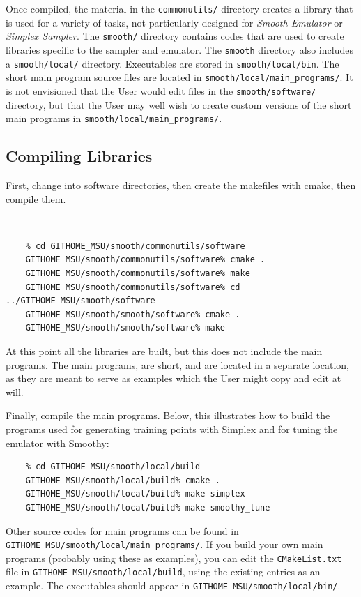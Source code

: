 \documentclass[main.tex]{subfiles}
\begin{document}
Once compiled, the material in the {\tt commonutils/} directory creates a library that is used for a variety of tasks, not particularly designed for {\it Smooth Emulator} or {\it Simplex Sampler}. The {\tt smooth/} directory contains codes that are used to create libraries specific to the sampler and emulator. The {\tt smooth} directory also includes a {\tt smooth/local/} directory. Executables are stored in {\tt smooth/local/bin}. The short main program source files are located in {\tt smooth/local/main\_programs/}. It is not envisioned that the User would edit files in the {\tt smooth/software/} directory, but that the User may well wish to create custom versions of the short main programs in {\tt smooth/local/main\_programs/}.

\subsection{Compiling Libraries }

First, change into software directories, then create the makefiles with cmake, then compile them.\\
\vspace{-20pt}
{\tt 
\begin{verbatim}
    % cd GITHOME_MSU/smooth/commonutils/software
    GITHOME_MSU/smooth/commonutils/software% cmake .
    GITHOME_MSU/smooth/commonutils/software% make
    GITHOME_MSU/smooth/commonutils/software% cd ../GITHOME_MSU/smooth/software
    GITHOME_MSU/smooth/smooth/software% cmake .
    GITHOME_MSU/smooth/smooth/software% make
\end{verbatim}
At this point all the libraries are built, but this does not include the main programs. The main programs, are short, and are located in a separate location, as they are meant to serve as examples which the User might copy and edit at will.

Finally, compile the main programs. Below, this illustrates how to build the programs used for generating training points with Simplex and for tuning the emulator with Smoothy:
\begin{verbatim}
    % cd GITHOME_MSU/smooth/local/build
    GITHOME_MSU/smooth/local/build% cmake .
    GITHOME_MSU/smooth/local/build% make simplex
    GITHOME_MSU/smooth/local/build% make smoothy_tune
\end{verbatim}
}
Other source codes for main programs can be found in {\tt GITHOME\_MSU/smooth/local/main\_programs/}. If you build your own main programs (probably using these as examples), you can edit the {\tt CMakeList.txt} file in {\tt GITHOME\_MSU/smooth/local/build}, using the existing entries as an example. The executables should appear in {\tt GITHOME\_MSU/smooth/local/bin/}. 
\end{document}
